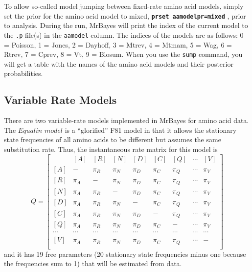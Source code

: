 \documentclass[12pt]{book}
\newcommand{\ttt}[1]{\texttt{#1} }
\newcommand{\tb}[1]{\ttt{\textbf{#1}} }
\begin{document}
To allow so-called model jumping between fixed-rate amino acid models, simply set the prior for the
amino acid model to mixed, \tb{prset aamodelpr=mixed}, prior to analysis. During the run, MrBayes
will print the index of the current model to the \ttt{.p} file(s) in the \ttt{aamodel} column. The
indices of the models are as follows: 0 = Poisson, 1 = Jones, 2 = Dayhoff, 3 = Mtrev, 4 = Mtmam, 5
= Wag, 6 = Rtrev, 7 = Cprev, 8 = Vt, 9 = Blosum. When you use the \ttt{sump} command, you will get
a table with the names of the amino acid models and their posterior probabilities.

\subsection{Variable Rate Models}
There are two variable-rate models implemented in MrBayes for amino acid data. The $Equalin$
$model$ is a ``glorified'' F81 model in that it allows the stationary state frequencies of all
amino acids to be different but assumes the same substitution rate. Thus, the instantaneous rate
matrix for this model is
\[
Q=\begin{bmatrix}
    & [A] & [R] & [N] & [D] & [C] & [Q] & \cdots & [V]\\ 
 [A]& - & \pi_{R} & \pi_{N} & \pi_{D}& \pi_{C}& \pi_{Q} & \cdots & \pi_V\\ 
 [R]& \pi_{A} &- &  \pi_{N} & \pi_{D}& \pi_{C}& \pi_{Q} & \cdots & \pi_V\\ 
 [N]& \pi_{A} &\pi_{R} &- &   \pi_{D}& \pi_{C}& \pi_{Q} & \cdots & \pi_V\\ 
 [D]& \pi_{A} &\pi_{R} &  \pi_{N}&- &  \pi_{C}& \pi_{Q} & \cdots & \pi_V\\ 
 [C]& \pi_{A} &\pi_{R} &  \pi_{N}&  \pi_{D}&- & \pi_{Q} & \cdots & \pi_V\\ 
 [Q]& \pi_{A} &\pi_{R} &  \pi_{N}&  \pi_{D}& \pi_{C} &- & \cdots & \pi_V\\  
 \cdots& \cdots& \cdots& \cdots& \cdots& \cdots& \cdots& \cdots& \cdots\\
 [V]& \pi_{A} &\pi_{R} &  \pi_{N}&  \pi_{D}& \pi_{C} &\pi_Q & \cdots &- \\ 
\end{bmatrix}
\]
and it has 19 free parameters (20 stationary state frequencies minus one because the frequencies
sum to 1) that will be estimated from data.
\end{document}
